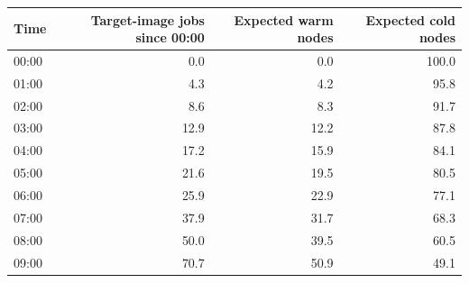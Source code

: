 \begin{tabular}{lrrr}
\toprule
Time & Target-image jobs since 00:00 & Expected warm nodes & Expected cold nodes \\
\midrule
00:00 & 0.0 & 0.0 & 100.0 \\
01:00 & 4.3 & 4.2 & 95.8 \\
02:00 & 8.6 & 8.3 & 91.7 \\
03:00 & 12.9 & 12.2 & 87.8 \\
04:00 & 17.2 & 15.9 & 84.1 \\
05:00 & 21.6 & 19.5 & 80.5 \\
06:00 & 25.9 & 22.9 & 77.1 \\
07:00 & 37.9 & 31.7 & 68.3 \\
08:00 & 50.0 & 39.5 & 60.5 \\
09:00 & 70.7 & 50.9 & 49.1 \\
\bottomrule
\end{tabular}
